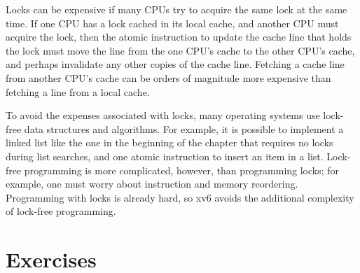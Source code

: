 Locks can be expensive if many CPUs try to acquire the same lock
at the same time.  If one CPU has a lock
cached in its local cache, and another CPU must acquire the lock, then the
atomic instruction to update the cache line that holds the lock must move the line
from the one CPU's cache to the other CPU's cache, and perhaps
invalidate any other copies of the cache line.  Fetching a cache line from
another CPU's cache can be orders of magnitude more expensive than
fetching a line from a local cache.

To avoid the expenses associated with locks, many operating systems use
lock-free data structures and algorithms.  For example, it is possible to
implement a linked list like the one in the beginning of the chapter that
requires no locks during list searches, and one atomic instruction to insert an
item in a list.  Lock-free programming is more complicated, however, than
programming locks; for example, one must worry about instruction and memory
reordering.  Programming with locks is already hard, so xv6 avoids the
additional complexity of lock-free programming.

\section{Exercises}


